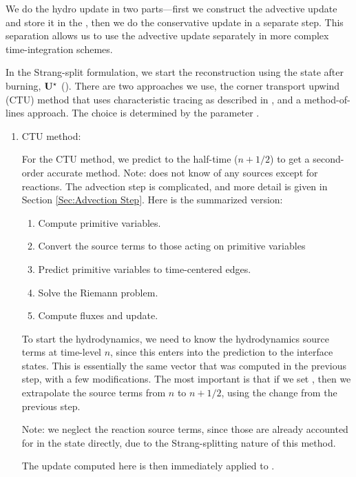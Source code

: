 \begin{enumerate}
  We do the hydro update in two parts---first we construct the
  advective update and store it in the 
  \multifab, then we do the conservative update in a separate step.  This
  separation allows us to use the advective update separately in more
  complex time-integration schemes.

  In the Strang-split formulation, we start the reconstruction using
  the state after burning, ${\bf U}^\star$ ().  There
  are two approaches we use, the corner transport upwind (CTU) method
  that uses characteristic tracing as described in
  \cite{colella:1990}, and a method-of-lines approach.  The choice is 
  determined by the parameter .

  \begin{enumerate}
  \item CTU method:

    For the CTU method, we predict to the half-time ($n+1/2$) to get a
    second-order accurate method.  Note:  does not
    know of any sources except for reactions.  The advection step is
    complicated, and more detail is given in Section
    \ref{Sec:Advection Step}.  Here is the summarized version:
  \begin{enumerate}
  \item Compute primitive variables.
  \item Convert the source terms to those acting on primitive variables
  \item Predict primitive variables to time-centered edges.
  \item Solve the Riemann problem.
  \item Compute fluxes and update.
  \end{enumerate}

  To start the hydrodynamics, we need to know the hydrodynamics source
  terms at time-level $n$, since this enters into the prediction to
  the interface states.  This is essentially the same vector that was
  computed in the previous step, with a few modifications.  The most
  important is that if we set
  , then we extrapolate the
  source terms from $n$ to $n+1/2$, using the change from the previous
  step.

  Note: we neglect the reaction source terms, since those are already
  accounted for in the state directly, due to the Strang-splitting
  nature of this method.

  The update computed here is then immediately applied to
  .



\end{enumerate}
\end{enumerate}
